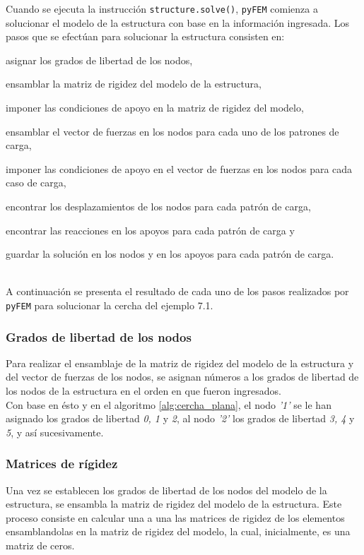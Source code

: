 Cuando se ejecuta la instrucción \texttt{structure.solve()}, \texttt{pyFEM} comienza a solucionar el modelo de la estructura con base en la información ingresada. Los pasos que se efectúan para solucionar la estructura consisten en: 
\begin{inparaenum}[$ (1) $]
    \item asignar los grados de libertad de los nodos, 
    \item ensamblar la matriz de rigidez del modelo de la estructura, 
    \item imponer las condiciones de apoyo en la matriz de rigidez del modelo, 
    \item ensamblar el vector de fuerzas en los nodos para cada uno de los patrones de carga, 
    \item imponer las condiciones de apoyo en el vector de fuerzas en los nodos para cada caso de carga, 
    \item encontrar los desplazamientos de los nodos para cada patrón de carga, 
    \item encontrar las reacciones en los apoyos para cada patrón de carga y
    \item guardar la solución en los nodos y en los apoyos para cada patrón de carga.
\end{inparaenum} \\

A continuación se presenta el resultado de cada uno de los pasos realizados por \texttt{pyFEM} para solucionar la cercha del ejemplo 7.1. \\

\subsubsection{Grados de libertad de los nodos}
Para realizar el ensamblaje de la matriz de rigidez del modelo de la estructura y del vector de fuerzas de los nodos, se asignan números a los grados de libertad de los nodos de la estructura en el orden en que fueron ingresados. \\

Con base en ésto y en el algoritmo \ref{alg:cercha_plana}, el nodo \textit{'1'} se le han asignado los grados de libertad \textit{0, 1} y \textit{2}, al nodo \textit{'2'} los grados de libertad \textit{3, 4} y \textit{5}, y así sucesivamente.

\subsubsection{Matrices de rígidez}
Una vez se establecen los grados de libertad de los nodos del modelo de la estructura, se ensambla la matriz de rigidez del modelo de la estructura. Este proceso consiste en calcular una a una las matrices de rigidez de los elementos ensamblandolas en la matriz de rigidez del modelo, la cual, inicialmente, es una matriz de ceros. \\

